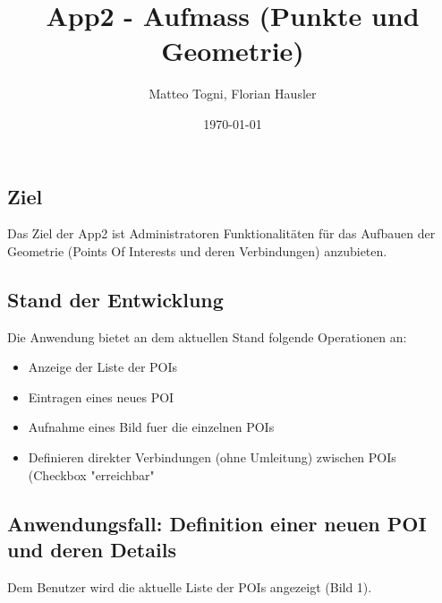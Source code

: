 \documentclass{article}
\title{App2 - Aufmass (Punkte und Geometrie)}
\date{\today}
\author{Matteo Togni, Florian Hausler}
\begin{document}
\clearpage\maketitle
\thispagestyle{empty}
\newpage

\subsection*{Ziel}
Das Ziel der App2 ist Administratoren Funktionalitäten für das Aufbauen der Geometrie (Points Of Interests und deren Verbindungen) anzubieten.


\subsection*{Stand der Entwicklung}
\label{subsubsec:stand}
Die Anwendung bietet an dem aktuellen Stand folgende Operationen an:
\begin{itemize}
  \item Anzeige der Liste der POIs
  \item Eintragen eines neues POI
  \item Aufnahme eines Bild fuer die einzelnen POIs
  \item Definieren direkter Verbindungen (ohne Umleitung) zwischen POIs (Checkbox "erreichbar"
\end{itemize}

\subsection*{Anwendungsfall: Definition einer neuen POI und deren Details}
\label{subsec:anwendungsfall_neuer_poi} 
Dem Benutzer wird die aktuelle Liste der POIs angezeigt (Bild 1).
\end{document}
